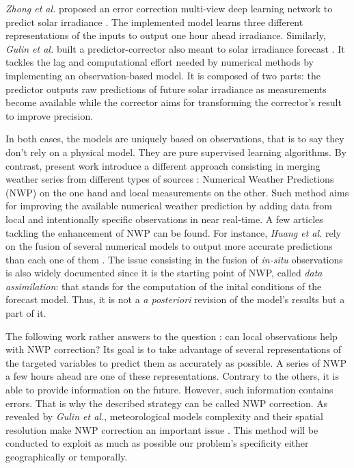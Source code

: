 \documentclass{article}
\newcommand{\saut}{\vspace{10px}}
\begin{document}
\saut

\emph{Zhong et al.} proposed an error correction multi-view deep learning network to predict
solar irradiance \cite{zhong_multi-view_2021}. The implemented model learns three different representations of the inputs 
to output one hour ahead irradiance. Similarly, \emph{Gulin et al.} built a predictor-corrector also meant to solar irradiance
forecast \cite{gulin_predictor-corrector_2015}. It tackles the lag and computational effort needed by numerical methods by implementing an observation-based model. It is composed of two parts: the predictor outputs raw
predictions of future solar irradiance as measurements become available while the corrector aims for transforming
the corrector's result to improve precision.

\saut

In both cases, the models are uniquely based on observations, that is to say they don't rely on a physical model.
They are pure supervised learning algorithms. By contrast, present work introduce a different approach consisting in
merging weather series from different types of sources : Numerical Weather Predictions (NWP) on the one hand and
local measurements on the other. Such method aims for improving the available numerical weather prediction by 
adding data from local and intentionally specific observations in near real-time. A few articles tackling the
enhancement of NWP can be found. For instance, \emph{Huang et al.} rely on the fusion of several numerical models to 
output more accurate predictions than each one of them \cite{huang_integrating_2012}. The issue consisting in the fusion 
of \emph{in-situ} observations is also widely documented since it is the starting point of NWP, called
\emph{data assimilation}: that stands for the computation
of the inital conditions of the forecast model. Thus, it is not a \emph{a posteriori} revision of the model's results but
a part of it. 

\saut

The following work rather answers to the question : can local observations help with NWP correction?
Its goal is to take advantage of several representations of the targeted variables to predict them as accurately as
possible. A series of NWP a few hours ahead are one of these representations. Contrary to the
others, it is able to provide information on the future. However, such information contains errors. That is why
the described strategy can be called NWP correction.
As revealed by \emph{Gulin et al.}, meteorological models complexity and their spatial resolution make NWP
correction an important issue \cite{gulin_predictor-corrector_2015}. This method will be conducted to
exploit as much as possible our problem's specificity either geographically or temporally.
\end{document}

